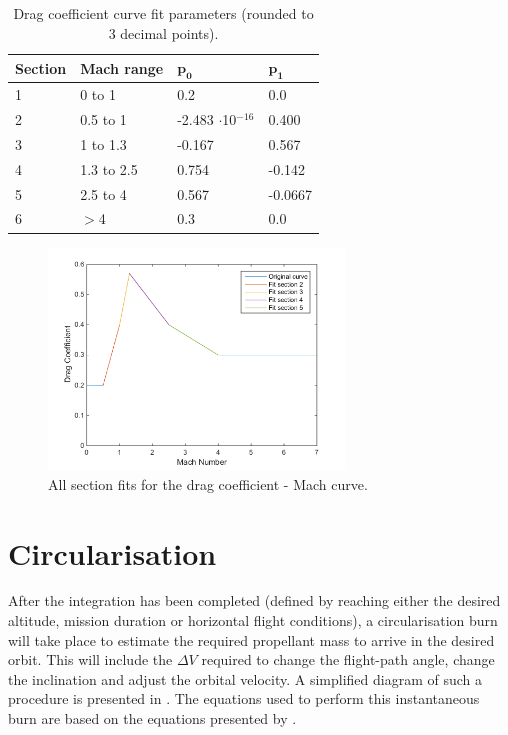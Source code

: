 \begin{table}[H]
\begin{center}
\caption{Drag coefficient curve fit parameters (rounded to 3 decimal points).}
\label{tab:dragCoeffPara}
\begin{tabular}{|l|l||l|l|}
\hline 
\textbf{Section}  & \textbf{Mach range}& $\mathbf{p_{0}}$ & $\mathbf{p_{1}}$ \\ \hline 
1 & 0 to 1  & 0.2 & 0.0 \\ \hline
2  & 0.5 to 1   & -2.483 $\cdot$10$^{-16}$ & 0.400 \\ \hline
3  & 1 to 1.3   & -0.167 & 0.567 \\ \hline
4  &  1.3 to 2.5  & 0.754 & -0.142 \\ \hline
5  &  2.5 to 4  & 0.567 & -0.0667 \\ \hline
6 & $>$4  & 0.3 & 0.0 \\ \hline
\end{tabular}
\end{center}
\end{table}



\begin{figure}[H]
\centering
\includegraphics[width=0.7\textwidth]{figures/software/dragCoeffFit.png}
\caption{All section fits for the drag coefficient - Mach curve.}
\label{fig:dragCoeffFit}
\end{figure}

\pagebreak

\section{Circularisation}
\label{sec:modelCircularisation}
After the integration has been completed (defined by reaching either the desired altitude, mission duration or horizontal flight conditions), a circularisation burn will take place to estimate the required propellant mass to arrive in the desired orbit. This will include the $\Delta V$ required to change the flight-path angle, change the inclination and adjust the orbital velocity. A simplified diagram of such a procedure is presented in . The equations used to perform this instantaneous burn are based on the equations presented by \cite{wakker2010}.

